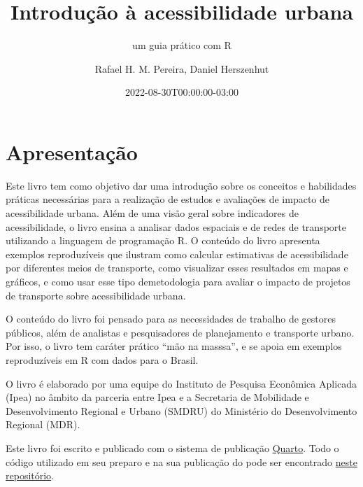 \documentclass[
  letterpaper,
  DIV=11,
  numbers=noendperiod]{scrreprt}
\title{Introdução à acessibilidade urbana}
\subtitle{um guia prático com R}
\author{Rafael H. M. Pereira, Daniel Herszenhut}
\date{2022-08-30T00:00:00-03:00}
\renewcommand*\contentsname{Table of contents}
\newcommand\contentsname{Table of contents}
\begin{document}
\maketitle
\ifdefined\Shaded\renewenvironment{Shaded}{\begin{tcolorbox}[boxrule=0pt, frame hidden, borderline west={3pt}{0pt}{shadecolor}, sharp corners, breakable, enhanced, interior hidden]}{\end{tcolorbox}}\fi

\renewcommand*\contentsname{Table of contents}
{
\hypersetup{linkcolor=}
\setcounter{tocdepth}{2}
\tableofcontents
}
\hypertarget{apresentauxe7uxe3o}{%
\chapter*{Apresentação}\label{apresentauxe7uxe3o}}

Este livro tem como objetivo dar uma introdução sobre os conceitos e
habilidades práticas necessárias para a realização de estudos e
avaliações de impacto de acessibilidade urbana. Além de uma visão geral
sobre indicadores de acessibilidade, o livro ensina a analisar dados
espaciais e de redes de transporte utilizando a linguagem de programação
R. O conteúdo do livro apresenta exemplos reproduzíveis que ilustram
como calcular estimativas de acessibilidade por diferentes meios de
transporte, como visualizar esses resultados em mapas e gráficos, e como
usar esse tipo demetodologia para avaliar o impacto de projetos de
transporte sobre acessibilidade urbana.

O conteúdo do livro foi pensado para as necessidades de trabalho de
gestores públicos, além de analistas e pesquisadores de planejamento e
transporte urbano. Por isso, o livro tem caráter prático ``mão na
masssa'', e se apoia em exemplos reproduzíveis em R com dados para o
Brasil.

O livro é elaborado por uma equipe do Instituto de Pesquisa Econômica
Aplicada (Ipea) no âmbito da parceria entre Ipea e a Secretaria de
Mobilidade e Desenvolvimento Regional e Urbano (SMDRU) do Ministério do
Desenvolvimento Regional (MDR).

\begin{tcolorbox}[enhanced jigsaw, opacityback=0, colback=white, rightrule=.15mm, breakable, toprule=.15mm, left=2mm, leftrule=.75mm, bottomrule=.15mm, arc=.35mm, colframe=quarto-callout-note-color-frame]
\begin{minipage}[t]{5.5mm}
\textcolor{quarto-callout-note-color}{\faInfo}
\end{minipage}%
\begin{minipage}[t]{\textwidth - 5.5mm}
Este livro foi escrito e publicado com o sistema de publicação
\href{https://quarto.org}{Quarto}. Todo o código utilizado em seu
preparo e na sua publicação do pode ser encontrado
\href{https://github.com/ipeaGIT/aop_curso/tree/main/aop_curso_pt}{neste
repositório}.\end{minipage}%
\end{tcolorbox}
\end{document}
